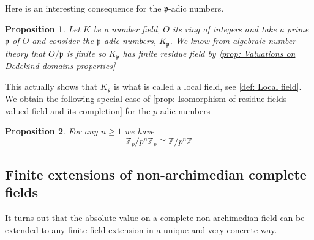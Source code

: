 \documentclass{article}
\newtheorem{proposition}{Proposition}[section]
\newcommand{\mfrak}[1]{\mathfrak{#1}}
\newcommand{\mbb}[1]{\mathbb{#1}}
\numberwithin{equation}{section}
\begin{document}
Here is an interesting consequence for the $\mfrak p$-adic numbers.
\begin{proposition}\label{fact: The P-adic numbers is a local ring}
	Let $K$ be a number field, $O$ its ring of integers and take a prime $\mfrak p$ of $O$ and consider the $\mfrak p$-adic numbers, $K_\mfrak p$. We know from algebraic number theory that $O / \mfrak p$ is finite so $K_\mfrak p$ has finite residue field by \cref{prop: Valuations on Dedekind domains properties}
\end{proposition}
This actually shows that $K_\mfrak p$ is what is called a local field, see \cref{def: Local field}. We obtain the following special case of \cref{prop: Isomorphism of residue fields valued field and its completion} for the $p$-adic numbers
\begin{proposition}\label{prop: Isomorphism of residue fields valued field and its completion special case}
	For any $n \geq 1$ we have
	$$\mbb Z_p / p^n \mbb Z_p \cong \mbb Z / p^n \mbb Z$$
\end{proposition}


\subsection{Finite extensions of non-archimedian complete fields}

It turns out that the absolute value on a complete non-archimedian field can be extended to any finite field extension in a unique and very concrete way.
\end{document}
